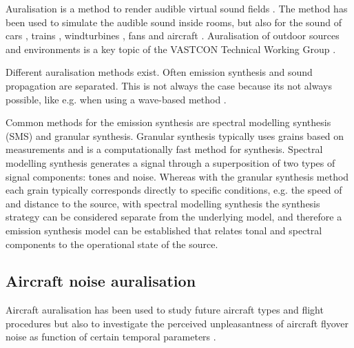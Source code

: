 Auralisation is a method to render audible virtual sound fields \cite{Kleiner1993}.
The method has been used to simulate the audible sound inside
rooms, but also for the sound of
cars \cite{Forssen2009,Maillard2012,Pieren2015,Hoffmann2016,Hoffmann2016a},
trains \cite{Pieren2016},
windturbines \cite{Pieren2014,Heutschi2014},
fans \cite{Merino2016} and
aircraft \cite{Arntzen2014a, Rizzi2016a, Rizzi2016}. Auralisation of outdoor sources
and environments is a key topic of the VASTCON Technical Working Group \cite{Vastcon}.


Different auralisation methods exist. Often emission synthesis and sound
propagation are separated. This is not always the case because its not always
possible, like e.g. when using a wave-based method
\cite{Hornikx2016,Georgiou2016,Georgiou2016a}.

Common methods for the emission synthesis are spectral modelling synthesis (SMS)
and granular synthesis. Granular synthesis typically uses grains based on
measurements and is a computationally fast method for synthesis. Spectral
modelling synthesis generates a signal through a superposition of two types of
signal components: tones and noise. Whereas with the granular synthesis method
each grain typically corresponds directly to specific conditions, e.g. the speed
of and distance to the source, with spectral modelling synthesis the synthesis
strategy can be considered separate from the underlying model, and therefore a
emission synthesis model can be established that relates tonal and spectral
components to the operational state of the source.



\subsection{Aircraft noise auralisation} 

Aircraft auralisation has been used to study future aircraft types
\cite{Rizzi2013,Rizzi2016,Rizzi2016a} and flight procedures \cite{Sahai2016} but
also to investigate the perceived unpleasantness of aircraft flyover noise as
function of certain temporal parameters \cite{Pate2017}.

